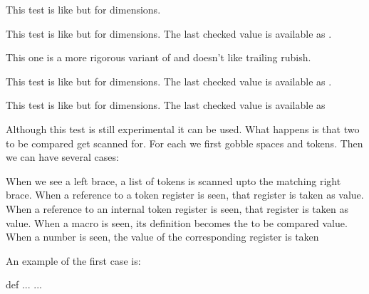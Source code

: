 \stopsectionlevel

\startsectionlevel[title={\tex{ifcmpdim}}]

This test is like \type {\ifcmpnum} but for dimensions.

\stopsectionlevel

\startsectionlevel[title={\tex{ifchkdim}}]

This test is like \type {\ifchknum} but for dimensions. The last checked value is
available as \type {\lastchknumber}.

\stopsectionlevel

\startsectionlevel[title={\tex{ifchkdimension}}]

This one is a more rigorous variant of \type {\ifchkdim} and doesn't like
trailing rubish.

\stopsectionlevel

\startsectionlevel[title={\tex{ifchkdimexpr}}]

This test is like \type {\ifchknumexpr} but for dimensions. The last checked value is
available as \type {\lastchkdimension}.

\stopsectionlevel

\startsectionlevel[title={\tex{ifdimval}}]

This test is like \type {\ifnumval} but for dimensions. The last checked value is
available as \type {\lastchkdim}

\stopsectionlevel

\startsectionlevel[title={\tex{iftok}}]

Although this test is still experimental it can be used. What happens is that
two to be compared  get scanned for. For each we first gobble
spaces and \type {\relax} tokens. Then we can have several cases:

\startitemize[n,packed]
    \startitem
        When we see a left brace, a list of tokens is scanned upto the
        matching right brace.
    \stopitem
    \startitem
        When a reference to a token register is seen, that register is taken as
        value.
    \stopitem
    \startitem
        When a reference to an internal token register is seen, that register is
        taken as value.
    \stopitem
    \startitem
        When a macro is seen, its definition becomes the to be compared value.
    \stopitem
    \startitem
        When a number is seen, the value of the corresponding register is taken
    \stopitem
\stopitemize

An example of the first case is:

\starttyping[option=TEX]
 {def}%
  ...
\else
  ...
\fi
\stoptyping

